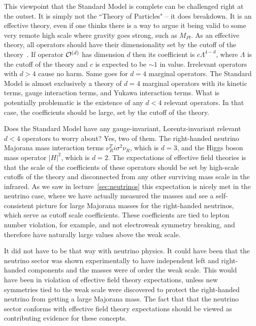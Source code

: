 \documentclass[12pt]{article}
\begin{document}
This viewpoint  that the Standard Model is complete can be challenged right at the outset. It is simply not the ``Theory of Particles" -- it does breakdown. It is an effective theory, even if one thinks there is a way to argue it being valid to some very remote high scale where gravity goes strong, such as $M_{Pl}$. As an effective theory, all operators should have their dimensionality set by the cutoff of the theory~\cite{Polchinski:1992ed}. 
If operator ${\cal O}^{(d)}$ has dimension $d$ then its coefficient is $c\Lambda^{4-d}$, where $\Lambda$ is the cutoff of the theory and $c$ is expected to be $\sim 1$ in value. Irrelevant operators with $d>4$ cause no harm. Same goes for $d=4$ marginal operators. The Standard Model is almost exclusively a theory of $d=4$ marginal operators with its kinetic terms, gauge interaction terms, and Yukawa interaction terms.  What is potentially problematic is the existence of any $d<4$ relevant operators. In that case, the coefficients should be large, set by the cutoff of the theory.

Does the Standard Model have any gauge-invariant, Lorentz-invariant relevant $d<4$ operators to worry about? Yes, two of them. The right-handed neutrino Majorana mass interaction terms $\nu_R^Ti\sigma^2\nu_R$, which is $d=3$, and  the Higgs boson mass operator  $|H|^2$, which is $d=2$.  The expectations of effective field theories is that the scale of the coefficients of these operators should be set by high-scale cutoffs of the theory and disconnected from any other surviving mass scale in the infrared. As we saw in lecture~\ref{sec:neutrinos} this expectation is nicely met in the neutrino case, where we have actually measured the masses and see a self-consistent picture for large Majorana masses for the right-handed neutrinos, which serve as cutoff scale coefficients. These coefficients are tied to lepton number violation, for example, and not electroweak symmetry breaking, and therefore have naturally large values above the weak scale.

It did not have to be that way with neutrino physics. It could have been that the neutrino sector was shown experimentally to have independent left and right-handed components and the masses were of order the weak scale. This would have been in violation of effective field theory expectations, unless new symmetries tied to the weak scale were discovered to protect the right-handed neutrino from getting a large Majorana mass.  The fact that that the neutrino sector conforms with effective field theory expectations should be viewed as contributing evidence for these concepts.
\end{document}
